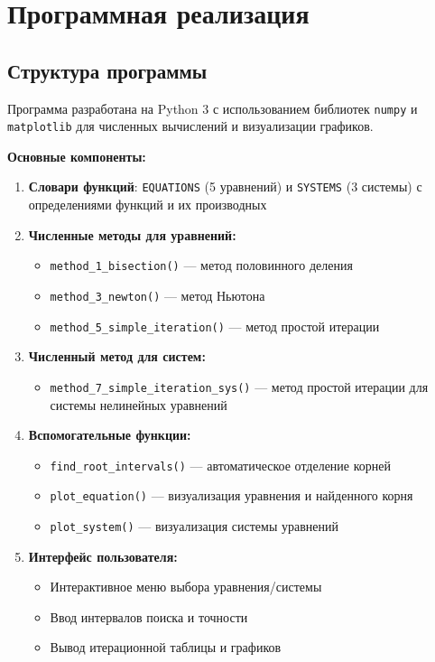 \documentclass[a4paper,12pt]{article}
\begin{document}
\newpage

\section{Программная реализация}

\subsection{Структура программы}

Программа разработана на Python 3 с использованием библиотек \texttt{numpy} и \texttt{matplotlib} для численных вычислений и визуализации графиков.

\textbf{Основные компоненты:}

\begin{enumerate}
    \item \textbf{Словари функций}: \texttt{EQUATIONS} (5 уравнений) и \texttt{SYSTEMS} (3 системы) с определениями функций и их производных
    
    \item \textbf{Численные методы для уравнений:}
    \begin{itemize}
        \item \texttt{method\_1\_bisection()} --- метод половинного деления
        \item \texttt{method\_3\_newton()} --- метод Ньютона
        \item \texttt{method\_5\_simple\_iteration()} --- метод простой итерации
    \end{itemize}
    
    \item \textbf{Численный метод для систем:}
    \begin{itemize}
        \item \texttt{method\_7\_simple\_iteration\_sys()} --- метод простой итерации для системы нелинейных уравнений
    \end{itemize}
    
    \item \textbf{Вспомогательные функции:}
    \begin{itemize}
        \item \texttt{find\_root\_intervals()} --- автоматическое отделение корней
        \item \texttt{plot\_equation()} --- визуализация уравнения и найденного корня
        \item \texttt{plot\_system()} --- визуализация системы уравнений
    \end{itemize}
    
    \item \textbf{Интерфейс пользователя:}
    \begin{itemize}
        \item Интерактивное меню выбора уравнения/системы
        \item Ввод интервалов поиска и точности
        \item Вывод итерационной таблицы и графиков
    \end{itemize}
\end{enumerate}
\end{document}
